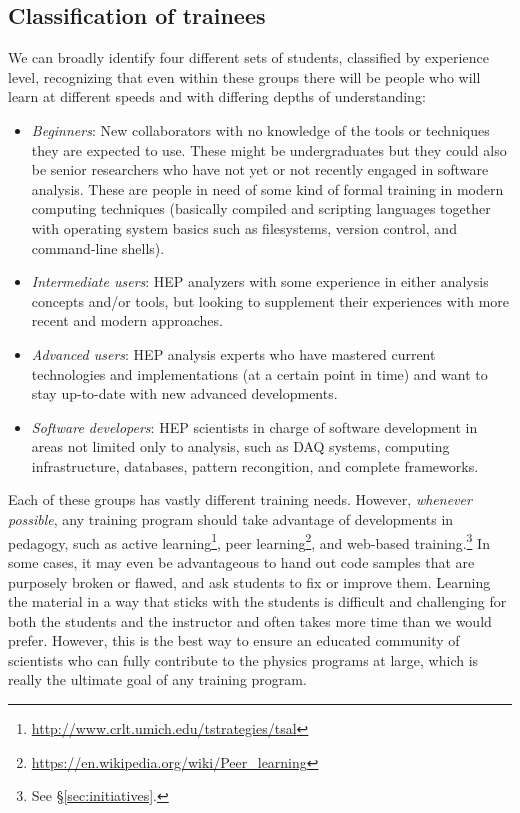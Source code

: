 \documentclass[12pt,a4paper]{article}
\begin{document}
\subsection{Classification of trainees}

We can broadly identify four different sets of students, classified by experience level,
recognizing that even within these groups there will be people who will learn at different
speeds and with differing depths of understanding:

\begin{itemize}
   \item \emph{Beginners}: New collaborators with no knowledge of the 
   tools or techniques they are expected to use. These might be undergraduates 
   but they could also be senior researchers who have not yet or not recently 
   engaged in software analysis. These are people in need of some kind of formal 
   training in modern computing techniques (basically compiled and scripting 
   languages together with operating system basics such as filesystems, version 
   control, and command-line shells).
   \item \emph{Intermediate users}: HEP analyzers with some experience in 
   either analysis concepts and/or tools, but  looking to supplement their 
   experiences with more recent and modern approaches. 
   \item \emph{Advanced users}: HEP analysis experts who have mastered current 
   technologies and implementations (at a certain point in time) and want to 
   stay up-to-date with new advanced developments.
   \item \emph{Software developers}: HEP scientists in charge of software 
   development in areas not limited only to analysis, such as DAQ systems, 
   computing infrastructure, databases, pattern recongition, and complete 
   frameworks.
\end{itemize}

Each of these groups has vastly different training needs. However,
\emph{whenever possible}, any training program should take advantage of
developments in pedagogy, such as active
learning\footnote{\url{http://www.crlt.umich.edu/tstrategies/tsal}}, peer
learning\footnote{\url{https://en.wikipedia.org/wiki/Peer_learning}}, and
web-based training.\footnote{See \S\ref{sec:initiatives}.} In some cases, it may
even be advantageous to hand out code samples that are purposely broken or
flawed, and ask students to fix or improve them. Learning the material in a way
that sticks with the students is difficult and challenging for both the students
and the instructor and often takes more time than we would prefer. However, this
is the best way to ensure an educated community of scientists who can fully
contribute to the physics programs at large, which is really the ultimate goal
of any training program.
\end{document}
